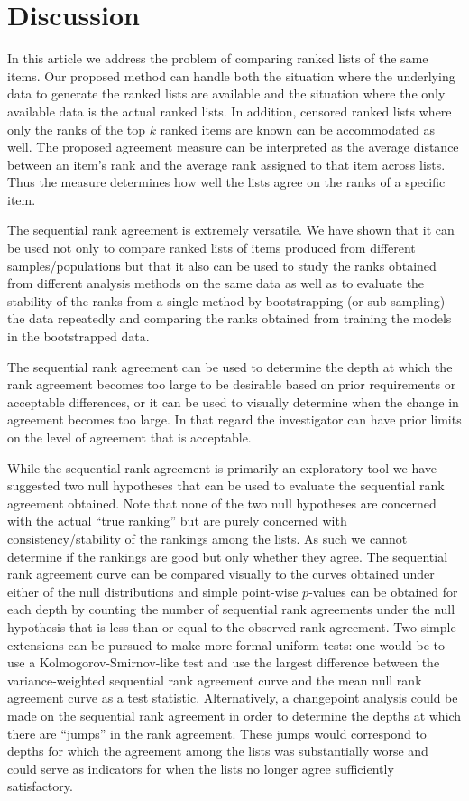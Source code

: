\documentclass[12pt,a4paper]{article}
\theoremstyle{plain}
\begin{document}
\section{Discussion}
In this article we address the problem of comparing ranked lists of
the same items. Our proposed method can handle both the situation
where the underlying data to generate the ranked lists are available
and the situation where the only available data is the actual ranked
lists. In addition, censored ranked lists where only the ranks of the
top $k$ ranked items are known can be accommodated as well. The
proposed agreement measure can be interpreted as the average distance
between an item's rank and the average rank assigned to that item
across lists. Thus the measure determines how well the lists agree on
the ranks of a specific item.

The sequential rank agreement is extremely versatile. We have shown
that it can be used not only to compare ranked lists of items produced
from different samples/populations but that it also can be used to
study the ranks obtained from different analysis methods on the same
data as well as to evaluate the stability of the ranks from a single
method by bootstrapping (or sub-sampling) the data repeatedly and
comparing the ranks obtained from training the models in the
bootstrapped data.

The sequential rank agreement can be used to determine the depth at
which the rank agreement becomes too large to be desirable based on
prior requirements or acceptable differences, or it can be used to
visually determine when the change in agreement becomes too large.  In
that regard the investigator can have prior limits on the level of
agreement that is acceptable.

While the sequential rank agreement is primarily an exploratory tool
we have suggested two null hypotheses that can be used to evaluate the
sequential rank agreement obtained. Note that none of the two null
hypotheses are concerned with the actual ``true ranking'' but are
purely concerned with consistency/stability of the rankings among the
lists. As such we cannot determine if the rankings are good but only
whether they agree. The sequential rank agreement curve can be
compared visually to the curves obtained under either of the null
distributions and simple point-wise $p$-values can be obtained for
each depth by counting the number of sequential rank agreements under
the null hypothesis that is less than or equal to the observed rank
agreement. Two simple extensions can be pursued to make more formal
uniform tests: one would be to use a Kolmogorov-Smirnov-like test and
use the largest difference between the variance-weighted sequential
rank agreement curve and the mean null rank agreement curve as a test
statistic. Alternatively, a changepoint analysis could be made on the
sequential rank agreement in order to determine the depths at which
there are ``jumps'' in the rank agreement. These jumps would
correspond to depths for which the agreement among the lists was
substantially worse and could serve as indicators for when the lists
no longer agree sufficiently satisfactory.
\end{document}
